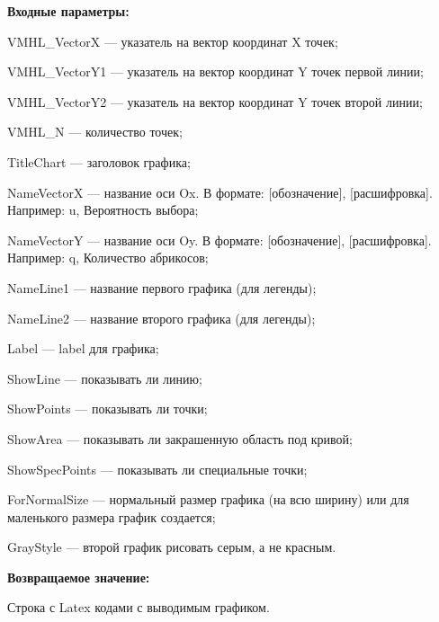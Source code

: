\textbf{Входные параметры:}
 
    VMHL\_VectorX --- указатель на вектор координат X точек;
 
    VMHL\_VectorY1 --- указатель на вектор координат Y точек первой линии;
 
    VMHL\_VectorY2 --- указатель на вектор координат Y точек второй линии;
 
    VMHL\_N --- количество точек;
 
    TitleChart --- заголовок графика;
 
    NameVectorX --- название оси Ox. В формате: [обозначение], [расшифровка]. Например: u, Вероятность выбора;
 
    NameVectorY --- название оси Oy. В формате: [обозначение], [расшифровка]. Например: q, Количество абрикосов;
 
    NameLine1 --- название первого графика (для легенды);
 
    NameLine2 --- название второго графика (для легенды);
 
    Label --- label для графика;
 
    ShowLine --- показывать ли линию;
 
    ShowPoints --- показывать ли точки;
 
    ShowArea --- показывать ли закрашенную область под кривой;
 
    ShowSpecPoints --- показывать ли специальные точки;
 
    ForNormalSize --- нормальный размер графика (на всю ширину) или для маленького размера график создается;
 
    GrayStyle --- второй график рисовать серым, а не красным.
	
\textbf{Возвращаемое значение:}

Строка с Latex кодами с выводимым графиком.